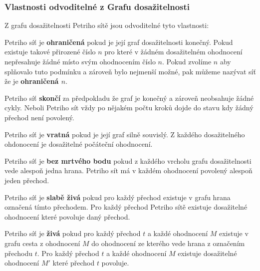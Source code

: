\documentclass[
  biblatex,
  glossaries,
  index
]{kidiplom}
\begin{document}
\subsubsection{Vlastnosti odvoditelné z Grafu dosažitelnosti}
Z grafu dosažitelnosti Petriho sítě jsou odvoditelné tyto vlastnosti:

\begin{definition}
  
  Petriho síť je \textbf{ohraničená} pokud 
  je její graf dosažitelnosti konečný. Pokud existuje takové přirozené číslo $n$
  pro které v žádném dosažitelném ohodnocení nepřesahuje žádné místo svým ohodnocením 
  číslo $n$. Pokud zvolíme $n$ aby splňovalo tuto podmínku a zároveň bylo 
  nejmenší možné, pak můžeme nazývat síť že je \textbf{ohraničená $n$}.
  
\end{definition}
\begin{definition}\label{def:skončí}
  
  Petriho síť \textbf{skončí} za předpokladu
  že graf je konečný a zároveň neobsahuje žádné cykly.
  Neboli Petriho sít vždy po nějakém počtu kroků dojde do stavu kdy žádný přechod není povolený.
  
\end{definition}
\begin{definition}
  
  Petriho síť je \textbf{vratná}
  pokud je její graf silně souvislý. Z každého dosažitelného 
  ohdonocení je dosažitelné počáteční ohodnocení.

\end{definition}
\begin{definition}
  
  Petriho síť je \textbf{bez mrtvého bodu}
  pokud z každého vrcholu grafu dosažitelnosti vede alespoň jedna hrana.
  Petriho sít má v každém ohodnocení povolený alespoň jeden přechod.

\end{definition}
\begin{definition}
  
  Petriho síť je \textbf{slabě živá} pokud pro
  každý přechod existuje v grafu hrana označená tímto přechodem.
  Pro každý přechod Petriho sítě existuje dosažitelné ohodnocení které 
  povoluje daný přechod.

\end{definition}
\begin{definition}
  
  Petriho síť je \textbf{živá} pokud 
  pro každý přechod $t$ a každé ohodnocení $M$ existuje v grafu cesta
  z ohodnocení $M$ do ohodnocení ze kterého vede hrana z označením přechodu $t$.
  Pro každý přechod $t$ a každé ohodnocení $M$ existuje dosažitelné ohodnocení $M'$ které přechod $t$ povoluje.
  
\end{definition}
  
\end{document}
